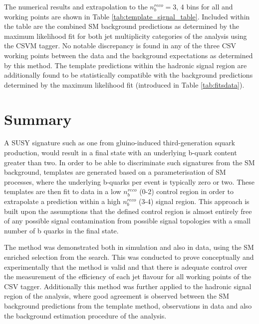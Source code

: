 The numerical results and extrapolation to the $n_{b}^{reco} =$3, 4 bins for all \theht and working points are shown in Table \ref{tab:template_signal_table}. Included within the table are the combined \ac{SM} background predictions as determined by the maximum likelihood fit for both jet multiplicity categories of the \alphat analysis using the \ac{CSVM} tagger. No notable discrepancy is found in any of the three \ac{CSV} working points between the data and the background expectations as determined by this method. The template predictions within the hadronic signal region are additionally found to be statistically compatible with the background predictions determined by the \alphat maximum likelihood fit (introduced in Table \ref{tab:fitsdata}).

\section{Summary}
\label{subsec:templateconclusions}

A \ac{SUSY} signature such as one from gluino-induced third-generation squark production, would result in a final state with an underlying b-quark content greater than two. In order to be able to discriminate such signatures from the \ac{SM} background, templates are generated based on a parameterisation of \ac{SM} processes, where the underlying b-quarks per event is typically zero or two. These templates are then fit to data in a low $n_{b}^{reco}$ (0-2) control region in order to extrapolate a prediction within a high $n_{b}^{reco}$ (3-4) signal region. This approach is built upon the assumptions that the defined control region is almost entirely free of any possible signal contamination from possible signal topologies with a small number of b quarks in the final state.

The method was demonstrated both in simulation and also in data, using the \ac{SM} enriched \mupjets selection from the \alphat search. This was conducted to prove conceptually and experimentally that the method is valid and that there is adequate control over the measurement of the efficiency of each jet flavour for all working points of the \ac{CSV} tagger. Additionally this method was further applied to the hadronic signal region of the \alphat analysis, where good agreement is observed between the \ac{SM} background predictions from the template method, observations in data and also the background estimation procedure of the \alphat analysis.

